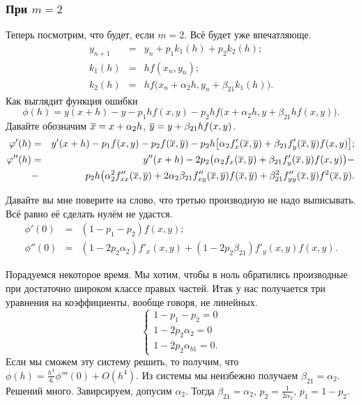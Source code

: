 \subsubsection{При $m=2$}
Теперь посмотрим, что будет, если $m=2$. Всё будет уже впечатляюще.
\begin{eqnarray*}
 y_{n+1} &=&  y_n + p_1 k_1(h) + p_2 k_2(h);\\
 k_1(h) &=&  h f(x_n,y_n);\\
 k_2(h) &=& hf\big(x_n + \alpha_2h,y_n + \beta_{21} k_1(h)\big).
\end{eqnarray*}
Как выглядит функция ошибки
\[
  \phi(h) = y(x+h) - y - p_1 h f(x,y) - p_2 h f\big(x + \alpha_2 h, y+ \beta_{21} h f(x,y)\big).
\]
Давайте обозначим $\overline{x} = x + \alpha_2 h$, $\overline{y} = y + \beta_{21} h f(x,y)$.
\begin{eqnarray*}
  \varphi'(h) &=&  y'(x+h) - p_1 f(x,y) - p_2 f(\overline{x},\overline{y}) - p_2 h
 \big[ \alpha_2 f'_x(\overline{x},\overline{y}) + \beta_{21} f'_y(\overline{x},\overline{y}) f(x,y)\big];\\
  \varphi''(h) &=&  y''(x+h) - 2 p_2 \big(\alpha_2 f_x(\overline{x},\overline{y}) + \beta_{21} f'_y(\overline{x},\overline{y}) f(x,y)\big) -\\
	&-& p_2 h\big( \alpha_2^2 f''_{xx} (\overline{x},\overline{y}) + 2 \alpha_2 \beta_{21} f''_{xy}(\overline{x},\overline{y})f(\overline{x},\overline{y}) + \beta_{21}^2 f''_{yy}(\overline{x},\overline{y}) f^2(\overline{x},\overline{y}).
\end{eqnarray*}

Давайте вы мне поверите на слово, что третью производную не надо выписывать. Всё равно её сделать нулём не удастся.
\begin{eqnarray*}
\phi'(0)&=& (1-p_1 - p_2) f(x,y);\\
\phi''(0) &=& (1 - 2p_2\alpha_2)f'_x(x,y) + (1 - 2p_2\beta_{21})f'_y(x,y)f(x,y).
\end{eqnarray*}

Порадуемся некоторое время. Мы хотим, чтобы в ноль обратились производные при достаточно широком классе правых частей. Итак у нас получается три уравнения на коэффициенты, вообще говоря, не линейных.
\[
\begin{cases}
 1 - p_1 - p_2 = 0\\
 1 - 2 p_2 \alpha_2 = 0\\
 1 - 2 p_2 \alpha_{b1} = 0.
\end{cases}
\]
Если мы сможем эту систему решить, то получим, что $\phi(h) = \frac{h^3}6 \phi'''(0) + O(h^4)$. Из системы мы неизбежно получаем $\beta_{21} = \alpha_2$. Решений много. Завирсируем, допусим $\alpha_2$. Тогда $\beta_{21} = \alpha_2$, $ p_2 = \frac1{2\alpha_2}$, $p_1 = 1-p_2$.

